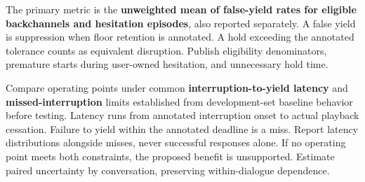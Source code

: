 \documentclass[11pt]{article}
\begin{document}
The primary metric is the \textbf{unweighted mean of false-yield rates for eligible backchannels and hesitation episodes}, also reported separately. A false yield is suppression when floor retention is annotated. A hold exceeding the annotated tolerance counts as equivalent disruption. Publish eligibility denominators, premature starts during user-owned hesitation, and unnecessary hold time.

Compare operating points under common \textbf{interruption-to-yield latency} and \textbf{missed-interruption} limits established from development-set baseline behavior before testing. Latency runs from annotated interruption onset to actual playback cessation. Failure to yield within the annotated deadline is a miss. Report latency distributions alongside misses, never successful responses alone. If no operating point meets both constraints, the proposed benefit is unsupported. Estimate paired uncertainty by conversation, preserving within-dialogue dependence.
\end{document}

